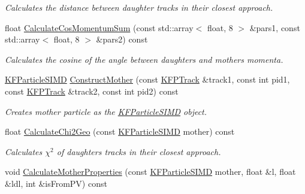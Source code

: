 \begin{DoxyCompactItemize}
\begin{DoxyCompactList}\small\item\em Calculates the distance between daughter tracks in their closest approach. \end{DoxyCompactList}\item 
float \hyperlink{classSimpleFinder_adf804cbf61f06440529c38f703182030}{Calculate\+Cos\+Momentum\+Sum} (const std\+::array$<$ float, 8 $>$ \&pars1, const std\+::array$<$ float, 8 $>$ \&pars2) const 
\begin{DoxyCompactList}\small\item\em Calculates the cosine of the angle between daughter\textquotesingle{}s and mother\textquotesingle{}s momenta. \end{DoxyCompactList}\item 
\hyperlink{classKFParticleSIMD}{K\+F\+Particle\+S\+I\+MD} \hyperlink{classSimpleFinder_a10ef8ed683c90625963c3185e5399771}{Construct\+Mother} (const \hyperlink{classKFPTrack}{K\+F\+P\+Track} \&track1, const int pid1, const \hyperlink{classKFPTrack}{K\+F\+P\+Track} \&track2, const int pid2) const \hypertarget{classSimpleFinder_a10ef8ed683c90625963c3185e5399771}{}\label{classSimpleFinder_a10ef8ed683c90625963c3185e5399771}

\begin{DoxyCompactList}\small\item\em Creates mother particle as the \hyperlink{classKFParticleSIMD}{K\+F\+Particle\+S\+I\+MD} object. \end{DoxyCompactList}\item 
float \hyperlink{classSimpleFinder_ab174fa409931711f1e2cc650b73922fb}{Calculate\+Chi2\+Geo} (const \hyperlink{classKFParticleSIMD}{K\+F\+Particle\+S\+I\+MD} mother) const \hypertarget{classSimpleFinder_ab174fa409931711f1e2cc650b73922fb}{}\label{classSimpleFinder_ab174fa409931711f1e2cc650b73922fb}

\begin{DoxyCompactList}\small\item\em Calculates $\chi^2$ of daughters\textquotesingle{} tracks in their closest approach. \end{DoxyCompactList}\item 
void \hyperlink{classSimpleFinder_a3cad4e43c94a2a57960ab867eb4207e0}{Calculate\+Mother\+Properties} (const \hyperlink{classKFParticleSIMD}{K\+F\+Particle\+S\+I\+MD} mother, float \&l, float \&ldl, int \&is\+From\+PV) const \hypertarget{classSimpleFinder_a3cad4e43c94a2a57960ab867eb4207e0}{}\label{classSimpleFinder_a3cad4e43c94a2a57960ab867eb4207e0}


\end{DoxyCompactItemize}

